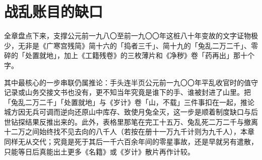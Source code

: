 \section{战乱账目的缺口}

全章盘点下来，支撑公元前一九八〇至前一九〇〇年这桩八十年变故的文字证物极少，无非是《广寒宫残简》简十六的「捣者三千」、简十九的「兔乱二万二千」、零碎的「处置就地」，加上《工籍残卷》的三枚薄片和《净秽》卷「药再出」那十个字。

其中最核心的一步串联仍属推论：手头连半页公元前一九〇〇年平乱收官时的值守记录或山务交接文书也没有，更不知当年究竟是谁下的手、谁被封进了山里。把「兔乱二万二千」「处置就地」与《岁计》卷「山，不载」三件事扣在一起，推论城方因无兵可调而逆向还原山中库存、致使月兔全灭，这一步是顺着制度缺口与后世钻探结果反推出来的。此外，表格里那笔在完工十五万、兔乱死二万二千与撤离十二万之间始终找不见去向的八千人（若按在册十一万九千计则为九千人），本章同样无从交代；究竟是死于其后一千六百余年间的零星事故，还是早就另有遣散，只能等日后真能出土更多《名籍》或《岁计》散片再作计较。
